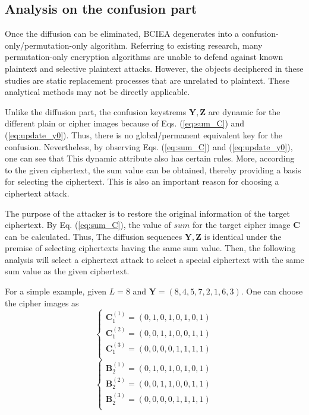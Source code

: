 \documentclass[final,3p,times]{elsarticle}
\begin{document}
\subsection{Analysis on the confusion part}

Once the diffusion can be eliminated, BCIEA degenerates into a confusion-only/permutation-only algorithm. Referring to existing research, many permutation-only encryption algorithms are unable to defend against known plaintext and selective plaintext attacks.
However, the objects deciphered in these studies are static replacement processes that are unrelated to plaintext. These analytical methods may not be directly applicable.

Unlike the diffusion part, the confusion keystrems $\bm{Y},\bm{Z}$ are dynamic for the different plain or cipher images because of Eqs. (\ref{eq:sum_C}) and (\ref{eq:update_y0}). Thus, there is no global/permanent equivalent key for the confusion.
Nevertheless, by observing Eqs. (\ref{eq:sum_C}) and (\ref{eq:update_y0}), one can see that This dynamic attribute also has certain rules. 
More, according to the given ciphertext, the sum value can be obtained, thereby providing a basis for selecting the ciphertext. This is also an important reason for choosing a ciphertext attack.

The purpose of the attacker is to restore the original information of the target ciphertext. By Eq. (\ref{eq:sum_C}), the value of $sum$ for the target cipher image $\bm{C}$ can be calculated. Thus, The diffusion sequences $\bm{Y},\bm{Z}$ is identical under the premise of selecting ciphertexts having the same sum value. Then, the following analysis will select a ciphertext attack to select a special ciphertext with the same sum value as the given ciphertext.

For a simple example, given $L=8$ and $\bm{Y}=(8,4,5,7,2,1,6,3)$. One can choose the cipher images as
\begin{equation}
\left\{ \begin{array}{l}
\bm{C}_1^{(1)} = (0,1,0,1,0,1,0,1) \\
\bm{C}_1^{(2)} = (0,0,1,1,0,0,1,1) \\
\bm{C}_1^{(3)} = (0,0,0,0,1,1,1,1) \\
\end{array} \right.
\label{eq:L8_C}
\end{equation}
\begin{equation}
\left\{ \begin{array}{l}
\bm{B}_2^{(1)} = (0,1,0,1,0,1,0,1) \\
\bm{B}_2^{(2)} = (0,0,1,1,0,0,1,1) \\
\bm{B}_2^{(3)} = (0,0,0,0,1,1,1,1) \\
\end{array} \right.
\label{eq:L8_B}
\end{equation}
\end{document}
